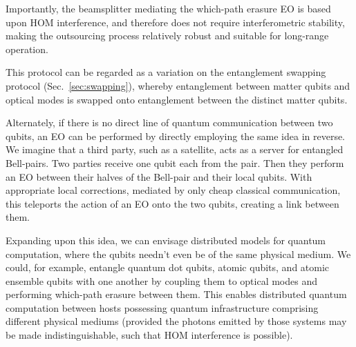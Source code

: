 Importantly, the beamsplitter mediating the which-path erasure EO is based upon HOM interference, and therefore does not require interferometric stability, making the outsourcing process relatively robust and suitable for long-range operation.

This protocol can be regarded as a variation on the entanglement swapping protocol (Sec.~\ref{sec:swapping}), whereby entanglement between matter qubits and optical modes is swapped onto entanglement between the distinct matter qubits.

Alternately, if there is no direct line of quantum communication between two qubits, an EO can be performed by directly employing the same idea in reverse. We imagine that a third party, such as a satellite, acts as a server for entangled Bell-pairs. Two parties receive one qubit each from the pair. Then they perform an EO between their halves of the Bell-pair and their local qubits. With appropriate local corrections, mediated by only cheap classical communication, this teleports the action of an EO onto the two qubits, creating a link between them.

Expanding upon this idea, we can envisage distributed models for quantum computation, where the qubits needn't even be of the same physical medium. We could, for example, entangle quantum dot qubits, atomic qubits, and atomic ensemble qubits with one another by coupling them to optical modes and performing which-path erasure between them. This enables distributed quantum computation between hosts possessing quantum infrastructure comprising different physical mediums (provided the photons emitted by those systems may be made indistinguishable, such that HOM interference is possible).

